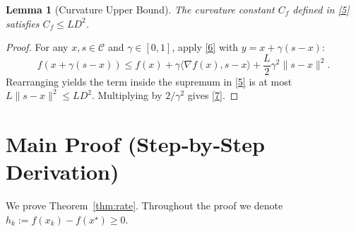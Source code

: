 \documentclass{article}
\newtheorem{lemma}{Lemma}
\begin{document}
\begin{lemma}[Curvature Upper Bound]\label{lem:curvature}
The curvature constant $C_f$ defined in \eqref{5} satisfies $C_f \le L D^{2}$.
\end{lemma}
\begin{proof}
For any $x,s\in\mathcal{C}$ and $\gamma\in[0,1]$, apply \eqref{6} with $y=x+\gamma(s-x)$:
\[
f(x+\gamma(s-x)) \le f(x) + \gamma\langle\nabla f(x),s-x\rangle + \frac{L}{2}\gamma^{2}\|s-x\|^{2}.
\]
Rearranging yields the term inside the supremum in \eqref{5} is at most $L\|s-x\|^{2}\le L D^{2}$. Multiplying by $2/\gamma^{2}$ gives \eqref{7}. \qedhere
\end{proof}

\section*{Main Proof (Step‑by‑Step Derivation)}
We prove Theorem~\ref{thm:rate}. Throughout the proof we denote $h_k:=f(x_k)-f(x^\star)\ge0$.
\end{document}
